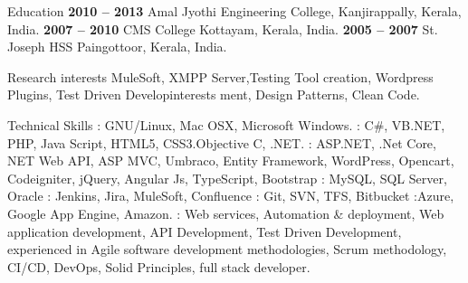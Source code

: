 \documentclass{resume}
\author{Babin Babu}
\begin{document}
\maketitle


\begin{category}{Education}
  \hfill \textbf{2010 -- 2013}
  \citemnobullet Amal Jyothi Engineering College, Kanjirappally, Kerala, India.
  \hfill \textbf{2007 -- 2010}
  \citemnobullet CMS College Kottayam, Kerala, India.
  \hfill \textbf{2005 -- 2007}
  \citemnobullet St. Joseph HSS Paingottoor, Kerala, India.
\end{category}


\begin{category}{Research interests}
  \citemnobullet MuleSoft, XMPP Server,Testing Tool creation, Wordpress Plugins, Test Driven Developinterests ment, Design Patterns, Clean Code.
\end{category}

\begin{category}{Technical Skills}
  : GNU/Linux, Mac OSX, Microsoft Windows.
  : C\#, VB.NET, PHP, Java Script, HTML5, CSS3.Objective C, .NET.
  : ASP.NET, .Net Core, NET Web API, ASP MVC, Umbraco, Entity Framework, WordPress, Opencart, Codeigniter, jQuery, Angular Js, TypeScript, Bootstrap
  : MySQL, SQL Server, Oracle
  :  Jenkins, Jira, MuleSoft, Confluence
  : Git, SVN, TFS, Bitbucket
  :Azure, Google App Engine, Amazon.
  : Web services, Automation \& deployment, Web application development, API Development, Test Driven Development, experienced in Agile software development methodologies, Scrum methodology, CI/CD, DevOps, Solid Principles, full stack developer.
\end{category}

\end{document}
